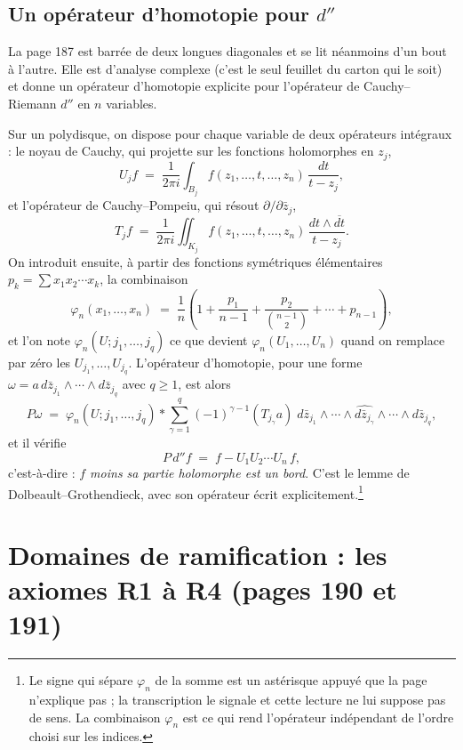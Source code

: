 \documentclass[11pt,a4paper]{article}
\begin{document}
\subsection*{Un opérateur d'homotopie pour $d''$}

La page 187 est barrée de deux longues diagonales et se lit néanmoins d'un bout
à l'autre. Elle est d'analyse complexe (c'est le seul feuillet du carton qui le
soit) et donne un opérateur d'homotopie explicite pour l'opérateur de
Cauchy--Riemann $d''$ en $n$ variables.

Sur un polydisque, on dispose pour chaque variable de deux opérateurs
intégraux : le noyau de Cauchy, qui projette sur les fonctions holomorphes en
$z_{j}$,
\[
  U_{j} f \;=\; \frac{1}{2\pi i} \int_{B_{j}}
    f(z_{1}, \ldots, t, \ldots, z_{n})\, \frac{dt}{t - z_{j}} ,
\]
et l'opérateur de Cauchy--Pompeiu, qui résout $\partial/\partial\bar{z}_{j}$,
\[
  T_{j} f \;=\; \frac{1}{2\pi i} \iint_{K_{j}}
    f(z_{1}, \ldots, t, \ldots, z_{n})\,
    \frac{dt \wedge \overline{dt}}{t - z_{j}} .
\]
On introduit ensuite, à partir des fonctions symétriques élémentaires
$p_{k} = \sum x_{1}x_{2}\cdots x_{k}$, la combinaison
\[
  \varphi_{n}(x_{1}, \ldots, x_{n}) \;=\; \frac{1}{n}\left(1 +
  \frac{p_{1}}{n-1} + \frac{p_{2}}{\binom{n-1}{2}} + \cdots + p_{n-1}\right) ,
\]
et l'on note $\varphi_{n}(U ; j_{1}, \ldots, j_{q})$ ce que devient
$\varphi_{n}(U_{1}, \ldots, U_{n})$ quand on remplace par zéro les
$U_{j_{1}}, \ldots, U_{j_{q}}$. L'opérateur d'homotopie, pour une forme
$\omega = a\, d\bar{z}_{j_{1}} \wedge \cdots \wedge d\bar{z}_{j_{q}}$ avec
$q \geqslant 1$, est alors
\[
  P\omega \;=\; \varphi_{n}(U ; j_{1}, \ldots, j_{q}) \ast
  \sum_{\gamma=1}^{q} (-1)^{\gamma-1} (T_{j_{\gamma}} a)\;
  d\bar{z}_{j_{1}} \wedge \cdots \wedge
  \widehat{d\bar{z}_{j_{\gamma}}} \wedge \cdots \wedge d\bar{z}_{j_{q}} ,
\]
et il vérifie
\[
  P\, d'' f \;=\; f - U_{1}U_{2}\cdots U_{n}\, f ,
\]
c'est-à-dire : \emph{$f$ moins sa partie holomorphe est un bord}. C'est le
lemme de Dolbeault--Grothendieck, avec son opérateur écrit
explicitement.\footnote{Le signe qui sépare $\varphi_{n}$ de la somme est un
astérisque appuyé que la page n'explique pas ; la transcription le signale et
cette lecture ne lui suppose pas de sens. La combinaison $\varphi_{n}$ est ce
qui rend l'opérateur indépendant de l'ordre choisi sur les indices.}

\section*{Domaines de ramification : les axiomes R1 à R4 (pages 190 et 191)}
\end{document}
